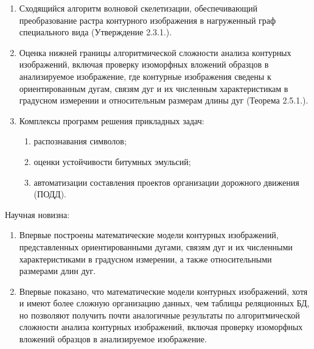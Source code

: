 \begin{enumerate}
	\item Сходящийся алгоритм волновой скелетизации,  обеспечивающий преобразование растра контурного изображения в нагруженный граф специального вида (Утверждение 2.3.1.).
	\item Оценка нижней границы алгоритмической сложности  анализа контурных изображений, включая проверку изоморфных вложений образцов в анализируемое изображение, где контурные изображения сведены к ориентированным дугам, связям дуг и их численным характеристикам в градусном измерении и  относительным размерам  длины дуг  (Теорема 2.5.1.).
	\item Комплексы программ  решения прикладных задач:
	\begin{enumerate}
		\item распознавания символов;
		\item оценки устойчивости битумных эмульсий;
		\item автоматизации составления проектов организации дорожного движения (ПОДД). 
	\end{enumerate}
\end{enumerate}
\noindent
Научная новизна:
\begin{enumerate}
\item Впервые построены математические модели контурных изображений, представленных ориентированными дугами, связям дуг и их численными характеристиками в градусном измерении,  а также  относительными размерами  длин дуг.  
\item Впервые  показано, что математические модели контурных изображений, хотя и имеют более сложную организацию данных, чем  таблицы реляционных БД, но позволяют получить почти аналогичные результаты по алгоритмической сложности  анализа контурных изображений, включая проверку изоморфных вложений образцов в анализируемое изображение.
\end{enumerate}
